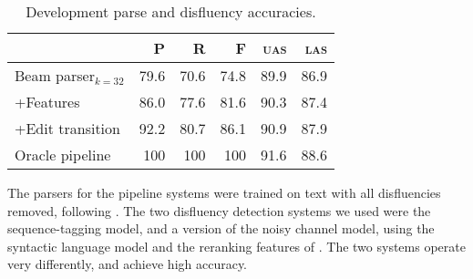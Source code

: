 \documentclass[11pt,letterpaper]{article}
\begin{document}
\begin{table}
    \centering
    \small
    \begin{tabular}{l|rrr|rr}
        & P & R & F & \textsc{uas} & \textsc{las} \\
        \hline \hline
Beam parser$_{k=32}$  &	79.6	&	70.6	&	74.8	&	89.9	&	86.9 \\
+Features             &	86.0	&	77.6	&	81.6	&	90.3	&	87.4 \\
+Edit transition      &	92.2	&	80.7	&	86.1	&	90.9	&	87.9 \\
\hline       
Oracle pipeline  & 100 & 100 & 100 & 91.6    & 88.6 \\
\hline
    \end{tabular}
\caption{Development parse and disfluency accuracies.
\label{tab:dev}}
\end{table}


The parsers for the pipeline systems were trained on text with all disfluencies
removed, following \citet{Charniak01a}. 
The two disfluency detection systems we used were the \citet{qian:13} sequence-tagging
model, and a version of the \citet{Johnson04a} noisy channel model, using the
\citet{Charniak01b} syntactic language model and the reranking features of
\citet{zwarts:11}. The two systems operate very differently, and achieve high
accuracy.


\end{document}
